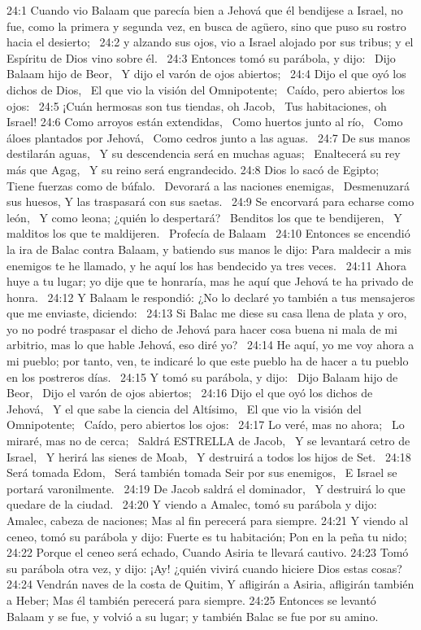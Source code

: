 24:1 Cuando vio Balaam que parecía bien a Jehová que él bendijese a Israel, no fue, como la primera y segunda vez, en busca de agüero, sino que puso su rostro hacia el desierto;  
24:2 y alzando sus ojos, vio a Israel alojado por sus tribus; y el Espíritu de Dios vino sobre él.  
24:3 Entonces tomó su parábola, y dijo:  
Dijo Balaam hijo de Beor,  
Y dijo el varón de ojos abiertos;  
24:4 Dijo el que oyó los dichos de Dios,  
El que vio la visión del Omnipotente;  
Caído, pero abiertos los ojos:  
24:5 ¡Cuán hermosas son tus tiendas, oh Jacob,  
Tus habitaciones, oh Israel! 
24:6 Como arroyos están extendidas,  
Como huertos junto al río,  
Como áloes plantados por Jehová,  
Como cedros junto a las aguas.  
24:7 De sus manos destilarán aguas,  
Y su descendencia será en muchas aguas;  
Enaltecerá su rey más que Agag,  
Y su reino será engrandecido. 
24:8 Dios lo sacó de Egipto;  
Tiene fuerzas como de búfalo.  
Devorará a las naciones enemigas,  
Desmenuzará sus huesos, 
Y las traspasará con sus saetas.  
24:9 Se encorvará para echarse como león,  
Y como leona; ¿quién lo despertará?  
Benditos los que te bendijeren,  
Y malditos los que te maldijeren.  
Profecía de Balaam  
24:10 Entonces se encendió la ira de Balac contra Balaam, y batiendo sus manos le dijo: Para maldecir a mis enemigos te he llamado, y he aquí los has bendecido ya tres veces.  
24:11 Ahora huye a tu lugar; yo dije que te honraría, mas he aquí que Jehová te ha privado de honra.  
24:12 Y Balaam le respondió: ¿No lo declaré yo también a tus mensajeros que me enviaste, diciendo:  
24:13 Si Balac me diese su casa llena de plata y oro, yo no podré traspasar el dicho de Jehová para hacer cosa buena ni mala de mi arbitrio, mas lo que hable Jehová, eso diré yo?  
24:14 He aquí, yo me voy ahora a mi pueblo; por tanto, ven, te indicaré lo que este pueblo ha de hacer a tu pueblo en los postreros días.  
24:15 Y tomó su parábola, y dijo:  
Dijo Balaam hijo de Beor,  
Dijo el varón de ojos abiertos;  
24:16 Dijo el que oyó los dichos de Jehová,  
Y el que sabe la ciencia del Altísimo,  
El que vio la visión del Omnipotente;  
Caído, pero abiertos los ojos:  
24:17 Lo veré, mas no ahora;  
Lo miraré, mas no de cerca;  
Saldrá ESTRELLA de Jacob,  
Y se levantará cetro de Israel,  
Y herirá las sienes de Moab,  
Y destruirá a todos los hijos de Set.  
24:18 Será tomada Edom,  
Será también tomada Seir por sus enemigos,  
E Israel se portará varonilmente.  
24:19 De Jacob saldrá el dominador,  
Y destruirá lo que quedare de la ciudad.  
24:20 Y viendo a Amalec, tomó su parábola y dijo: 
Amalec, cabeza de naciones; 
Mas al fin perecerá para siempre. 
24:21 Y viendo al ceneo, tomó su parábola y dijo: 
Fuerte es tu habitación; 
Pon en la peña tu nido; 
24:22 Porque el ceneo será echado, 
Cuando Asiria te llevará cautivo. 
24:23 Tomó su parábola otra vez, y dijo: 
¡Ay! ¿quién vivirá cuando hiciere Dios estas cosas? 
24:24 Vendrán naves de la costa de Quitim, 
Y afligirán a Asiria, afligirán también a Heber; 
Mas él también perecerá para siempre. 
24:25 Entonces se levantó Balaam y se fue, 
y volvió a su lugar; y también Balac se fue por su amino.  
